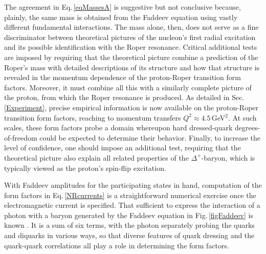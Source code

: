 The agreement in Eq.\,\eqref{eqMassesA} is suggestive but not conclusive because, plainly, the same mass is obtained from the Faddeev equation using vastly different fundamental interactions.  The mass alone, then, does not serve as a fine discriminator between theoretical pictures of the nucleon's first radial excitation and its possible identification with the Roper resonance.   Critical additional tests are imposed by requiring that the theoretical picture combine a prediction of the Roper's mass with detailed descriptions of its structure and how that structure is revealed in the momentum dependence of the proton-Roper transition form factors.  Moreover, it must combine all this with a similarly complete picture of the proton, from which the Roper resonance is produced.  As detailed in Sec.\,\ref{Experiment}, precise empirical information is now available on the proton-Roper transition form factors, reaching to momentum transfers $Q^2\approx 4.5\,$GeV$^2$.  At such scales, these form factors probe a domain whereupon hard dressed-quark degrees-of-freedom could be expected to determine their behavior.  Finally, to increase the level of confidence, one should impose an additional test, requiring that the theoretical picture also explain all related properties of the $\Delta^+$-baryon, which is typically viewed as the proton's spin-flip excitation.

With Faddeev amplitudes for the participating states in hand, computation of the form factors in Eq.\,\eqref{NRcurrents} is a straightforward numerical exercise once the electromagnetic current is specified.  That sufficient to express the interaction of a photon with a baryon generated by the Faddeev equation in Fig.\,\ref{figFaddeev} is known \cite{Oettel:1999gc, Segovia:2014aza}.  It is a sum of six terms, with the photon separately probing the quarks and diquarks in various ways, so that diverse features of quark dressing and the quark-quark correlations all play a role in determining the form factors.

